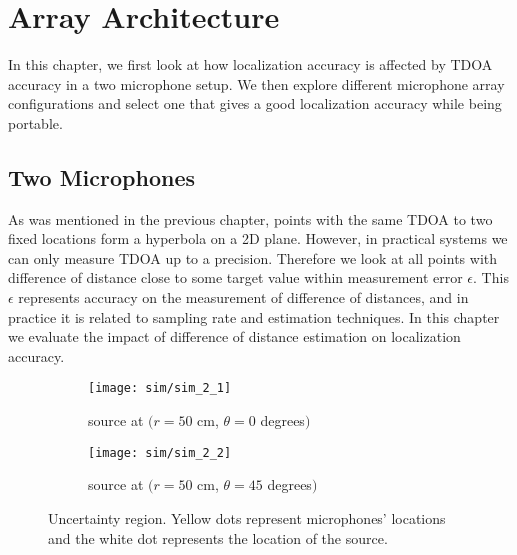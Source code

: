 \chapter{Array Architecture}

In this chapter, we first look at how localization accuracy is affected by TDOA accuracy in a two microphone setup. We then explore different microphone array configurations and select one that gives a good localization accuracy while being portable.

\section{Two Microphones}
As was mentioned in the previous chapter, points with the same TDOA to two fixed locations form a hyperbola on a 2D plane. However, in practical systems we can only measure TDOA up to a precision. Therefore we look at all points with difference of distance close to some target value within measurement error $\epsilon$. This $\epsilon$ represents accuracy on the measurement of difference of distances, and in practice it is related to sampling rate and estimation techniques. In this chapter we evaluate the impact of difference of distance estimation on localization accuracy.

\begin{figure}[]
  \centering
  \begin{subfigure}[]{.48\textwidth}
    \texttt{[image: sim/sim\_2\_1]}
    \caption{source at $(r=50$ cm, $\theta = 0$ degrees$)$}
  \end{subfigure}
  \begin{subfigure}[]{.48\textwidth}
    \texttt{[image: sim/sim\_2\_2]}
    \caption{source at $(r=50$ cm, $\theta = 45$ degrees$)$}
  \end{subfigure}
  \caption{Uncertainty region. Yellow dots represent microphones' locations and the white dot represents the location of the source.}
  \label{fig:sim_2_5}
\end{figure}

